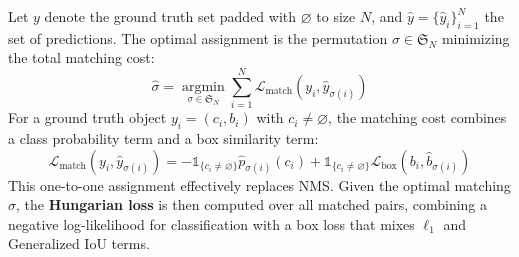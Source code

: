 Let $y$ denote the ground truth set padded with $\varnothing$ to size $N$, and $\hat{y} = \{\hat{y}_i\}_{i=1}^N$ the set of predictions. The optimal assignment is the permutation $\sigma \in \mathfrak{S}_N$ minimizing the total matching cost:
\begin{equation}
    \hat{\sigma} = \operatorname*{argmin}_{\sigma \in \mathfrak{S}_N} \sum_{i=1}^{N} \mathcal{L}_{\text{match}}(y_i, \hat{y}_{\sigma(i)})
\end{equation}
For a ground truth object $y_i = (c_i, b_i)$ with $c_i \neq \varnothing$, the matching cost combines a class probability term and a box similarity term:
\begin{equation}
    \mathcal{L}_{\text{match}}(y_i, \hat{y}_{\sigma(i)}) = - \mathbb{1}_{\{c_i \neq \varnothing\}} \hat{p}_{\sigma(i)}(c_i) + \mathbb{1}_{\{c_i \neq \varnothing\}} \mathcal{L}_{\text{box}}(b_i, \hat{b}_{\sigma(i)})
\end{equation}
This one-to-one assignment effectively replaces NMS. Given the optimal matching $\hat{\sigma}$, the \textbf{Hungarian loss} is then computed over all matched pairs, combining a negative log-likelihood for classification with a box loss that mixes $\ell_1$ and Generalized IoU terms.
